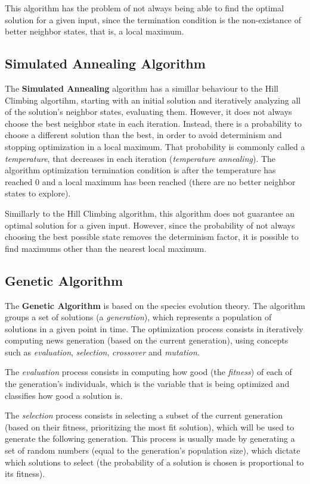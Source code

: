 \documentclass[conference]{IEEEtran}
\begin{document}
This algorithm has the problem of not always being able to find the optimal solution for a given input, since the termination condition is the non-existance of better neighbor states, that is, a local maximum.

\subsection{Simulated Annealing Algorithm}

The \textbf{Simulated Annealing} algorithm has a simillar behaviour to the Hill Climbing algortihm, starting with an initial solution and iteratively analyzing all of the solution's neighbor states, evaluating them. However, it does not always choose the best neighbor state in each iteration. Instead, there is a probability to choose a different solution than the best, in order to avoid determinism and stopping optimization in a local maximum. That probability is commonly called a \textit{temperature}, that decreases in each iteration (\textit{temperature annealing}). The algorithm optimization termination condition is after the temperature has reached 0 and a local maximum has been reached (there are no better neighbor states to explore).

Simillarly to the Hill Climbing algorithm, this algorithm does not guarantee an optimal solution for a given input. However, since the probability of not always choosing the best possible state removes the determinism factor, it is possible to find maximums other than the nearest local maximum.

\subsection{Genetic Algorithm}

The \textbf{Genetic Algorithm} is based on the species evolution theory. The algorithm groups a set of solutions (a \textit{generation}), which represents a population of solutions in a given point in time. The optimization process consists in iteratively computing news generation (based on the current generation), using concepts such as \textit{evaluation}, \textit{selection}, \textit{crossover} and \textit{mutation}. 

The \textit{evaluation} process consists in computing how good (the \textit{fitness}) of each of the generation's individuals, which is the variable that is being optimized and classifies how good a solution is.

The \textit{selection} process consists in selecting a subset of the current generation (based on their fitness, prioritizing the most fit solution), which will be used to generate the following generation. This process is usually made by generating a set of random numbers (equal to the generation's population size), which dictate which solutions to select (the probability of a solution is chosen is proportional to its fitness).
\end{document}
